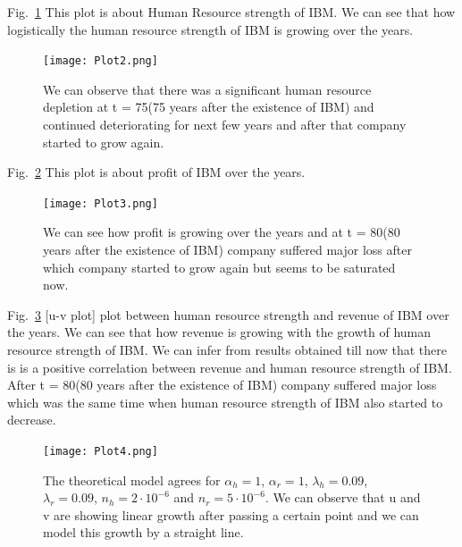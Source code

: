 \documentclass[aps,twocolumn,10pt,reprint]{revtex4}
\begin{document}
Fig.~\ref{Fig:image2f} This plot is about Human Resource strength of IBM. We can see that how logistically the human resource strength of IBM is growing over the years.
\begin{figure}[!h]
\centering
\texttt{[image: Plot2.png]}~
\caption{ We can observe that there was a significant human resource depletion at t = 75(75 years after the existence of IBM) and continued deteriorating for next few years and after that company started to grow again.}\label{Fig:image2f}
\end{figure}

Fig.~\ref{Fig:image3f} This plot is about profit of IBM over the years. 
\begin{figure}[!h]
\centering
\texttt{[image: Plot3.png]}~
\caption{We can see how profit is growing over the years and at t = 80(80 years after the existence of IBM) company suffered major loss after which company started to grow again but seems to be saturated now.}\label{Fig:image3f}
\end{figure}

Fig.~\ref{Fig:image4f} [u-v plot] plot between human resource strength and revenue of IBM over the years. We can see that how revenue is growing with the growth of human resource strength of IBM. We can infer from results obtained till now that there is is a positive correlation between revenue and human resource strength of IBM. After t = 80(80 years after the existence of IBM) company suffered major loss which was the same time when human resource strength of IBM also started to decrease.
\begin{figure}[!h]
\centering
\texttt{[image: Plot4.png]}~

\caption{The theoretical model agrees for $\alpha_{h}=1$, $\alpha_{r}=1$, $\lambda_{h}=0.09$, $\lambda_{r}=0.09$, $n_{h}=2 \cdot10^{-6}$ and $n_{r}=5 \cdot10^{-6}$. We can observe that u and v are showing linear growth after passing a certain point and we can model this growth by a straight line.}\label{Fig:image4f}
\end{figure}
\end{document}
